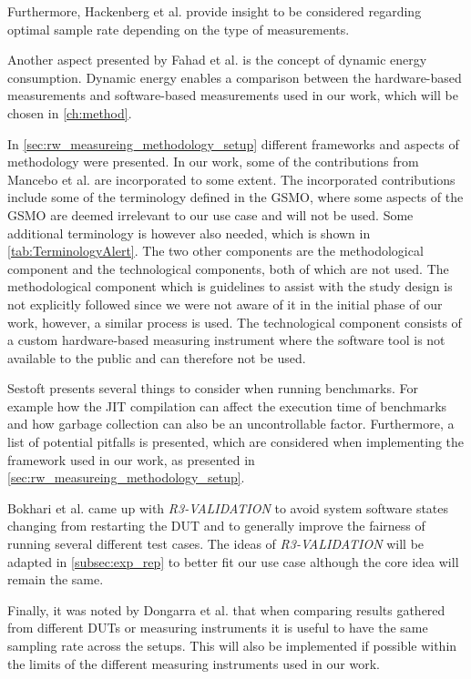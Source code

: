 Furthermore, Hackenberg et al.\cite{hackenberg2013} provide insight to be considered regarding optimal sample rate depending on the type of measurements.

Another aspect presented by Fahad et al.\cite{fahad2019comparative} is the concept of dynamic energy consumption. Dynamic energy enables a comparison between the hardware-based measurements and software-based measurements used in our work, which will be chosen in \cref{ch:method}.\newline


In \cref{sec:rw_measureing_methodology_setup} different frameworks and aspects of methodology were presented. In our work, some of the contributions from Mancebo et al. \cite{GarciaFEETINGS} are incorporated to some extent. The incorporated contributions include some of the terminology defined in the GSMO, where some aspects of the GSMO are deemed irrelevant to our use case and will not be used. Some additional terminology is however also needed, which is shown in \cref{tab:TerminologyAlert}. The two other components are the methodological component and the technological components, both of which are not used. The methodological component which is guidelines to assist with the study design is not explicitly followed since we were not aware of it in the initial phase of our work, however, a similar process is used. The technological component consists of a custom hardware-based measuring instrument where the software tool is not available to the public and can therefore not be used.\newline

Sestoft\cite{sestoft2013microbenchmarks} presents several things to consider when running benchmarks. For example how the JIT compilation can affect the execution time of benchmarks and how garbage collection can also be an uncontrollable factor. Furthermore, a list of potential pitfalls is presented, which are considered when implementing the framework used in our work, as presented in \cref{sec:rw_measureing_methodology_setup}.\newline

Bokhari et al.\cite{Bokhari2020r3} came up with \textit{R3-VALIDATION} to avoid system software states changing from restarting the DUT and to generally improve the fairness of running several different test cases. The ideas of \textit{R3-VALIDATION} will be adapted in \cref{subsec:exp_rep} to better fit our use case although the core idea will remain the same.\newline

Finally, it was noted by Dongarra et al.\cite{Dongarra2012} that when comparing results gathered from different DUTs or measuring instruments it is useful to have the same sampling rate across the setups. This will also be implemented if possible within the limits of the different measuring instruments used in our work.


